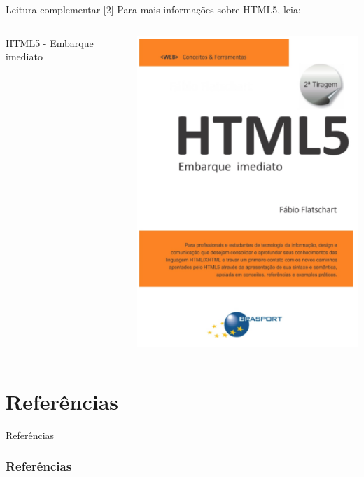 \documentclass{beamer}
\begin{document}
\begin{frame}{Leitura complementar [2]}
 Para mais informações sobre HTML5, leia:\\
 \begin{columns}
   \begin{column}{0.4\textwidth}
     HTML5 - Embarque imediato\\ 
      \cite{flatschart2011html}
   \end{column}
   \begin{column}{0.3\textwidth}
    \begin{center}
  \includegraphics[height=0.5\paperheight]{flatschart2014html.png} \\
 \end{center}
   \end{column}
 \end{columns}
\end{frame}
\section{Referências}
\begin{frame}{Referências}%
\frametitle{Referências}
\small
\begin{center}
\tiny


\end{center}
\end{frame}
\end{document}
